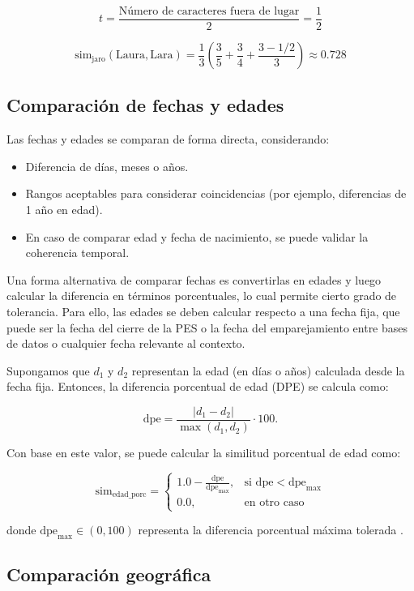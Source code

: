 \documentclass[
  12pt,
]{book}
\providecommand{\tightlist}{%
  \setlength{\itemsep}{0pt}\setlength{\parskip}{0pt}}
\begin{document}
\[t = \frac{\text{Número de caracteres fuera de lugar}}{2} = \frac{1}{2}\]

\[\text{sim}_{\text{jaro}}(\text{Laura}, \text{Lara}) = \frac{1}{3}\left( \frac{3}{5} + \frac{3}{4} + \frac{3 - 1/2}{3}\right) \approx 0.728\]

\subsection{Comparación de fechas y edades}\label{comparaciuxf3n-de-fechas-y-edades}

Las fechas y edades se comparan de forma directa, considerando:

\begin{itemize}
\tightlist
\item
  Diferencia de días, meses o años.
\item
  Rangos aceptables para considerar coincidencias (por ejemplo, diferencias de 1 año en edad).
\item
  En caso de comparar edad y fecha de nacimiento, se puede validar la coherencia temporal.
\end{itemize}

Una forma alternativa de comparar fechas es convertirlas en edades y luego calcular la diferencia en términos porcentuales, lo cual permite cierto grado de tolerancia. Para ello, las edades se deben calcular respecto a una fecha fija, que puede ser la fecha del cierre de la PES o la fecha del emparejamiento entre bases de datos o cualquier fecha relevante al contexto.

Supongamos que \(d_1\) y \(d_2\) representan la edad (en días o años) calculada desde la fecha fija. Entonces, la diferencia porcentual de edad (DPE) se calcula como:

\[\text{dpe} = \frac{|d_1 - d_2|}{\max(d_1, d_2)} \cdot 100.\]

Con base en este valor, se puede calcular la similitud porcentual de edad como:

\[
\text{sim}_{\text{edad_porc}} =
\begin{cases}
1.0 - \frac{\text{dpe}}{\text{dpe}_{\max}}, & \text{si } \text{dpe} < \text{dpe}_{\max} \\
0.0, & \text{en otro caso}
\end{cases}
\]

donde \(\text{dpe}_{\max} \in (0, 100)\) representa la diferencia porcentual máxima tolerada \citep{christen2012data}.

\subsection{Comparación geográfica}\label{comparaciuxf3n-geogruxe1fica}
\end{document}
